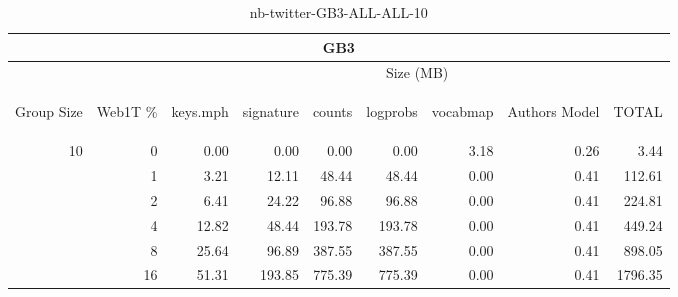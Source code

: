 \begin{center}
\begin{table}[htbp]
\begin{tabular}{ | r | r | r | r | r | r | r | r | r |}
\hline
\multicolumn{9}{|c|}{GB3}\\
\hline
 & & \multicolumn{7}{|c|}{Size (MB)}\\ \cline{3-9}
\begin{sideways}Group Size\end{sideways} & \begin{sideways}Web1T \% \end{sideways} & \begin{sideways}keys.mph\end{sideways} & \begin{sideways}signature\end{sideways} & \begin{sideways}counts\end{sideways} & \begin{sideways}logprobs\end{sideways} & \begin{sideways}vocabmap\end{sideways} & \begin{sideways}Authors Model \end{sideways} & \begin{sideways}TOTAL\end{sideways}\\
\hline
\multirow{5}{*}{10}
 & 0 & 0.00 & 0.00 & 0.00 & 0.00 & 3.18 & 0.26 & 3.44\\ \cline{2-9}
 & 1 & 3.21 & 12.11 & 48.44 & 48.44 & 0.00 & 0.41 & 112.61\\ \cline{2-9}
 & 2 & 6.41 & 24.22 & 96.88 & 96.88 & 0.00 & 0.41 & 224.81\\ \cline{2-9}
 & 4 & 12.82 & 48.44 & 193.78 & 193.78 & 0.00 & 0.41 & 449.24\\ \cline{2-9}
 & 8 & 25.64 & 96.89 & 387.55 & 387.55 & 0.00 & 0.41 & 898.05\\ \cline{2-9}
 & 16 & 51.31 & 193.85 & 775.39 & 775.39 & 0.00 & 0.41 & 1796.35\\ \cline{2-9}
\hline
\end{tabular}
\caption{nb-twitter-GB3-ALL-ALL-10}
\label{table:nb-twitter-GB3-ALL-ALL-10}
\end{table}
\end{center}

